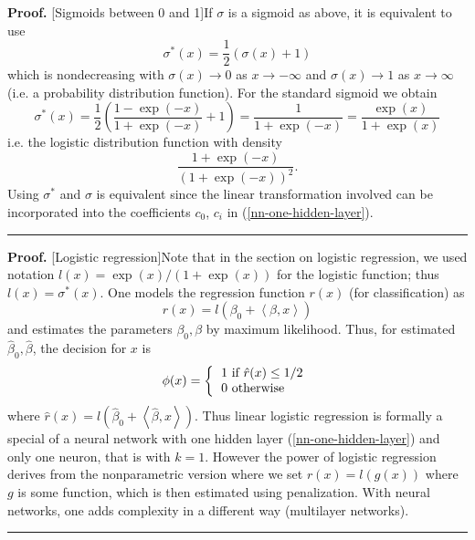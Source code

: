 \documentclass[11pt,twoside]{article}%
\theoremstyle{change}
\newenvironment{proof}[1][Proof]{\textbf{#1.} }{\ \rule{0.5em}{0.5em}}
\begin{document}
\begin{proof}
[Sigmoids between 0 and 1]If $\sigma$ is a sigmoid as above, it is equivalent
to use
\[
\sigma^{\ast}(x)=\frac{1}{2}\left(  \sigma(x)+1\right)
\]
which is nondecreasing with $\sigma(x)\rightarrow0$ as $x\rightarrow-\infty$
and $\sigma(x)\rightarrow1$ as $x\rightarrow\infty$ (i.e. a probability
distribution function). For the standard sigmoid we obtain
\[
\sigma^{\ast}(x)=\frac{1}{2}\left(  \frac{1-\exp(-x)}{1+\exp(-x)}+1\right)
=\frac{1}{1+\exp(-x)}=\frac{\exp(x)}{1+\exp(x)}%
\]
i.e. the logistic distribution function with density
\[
\frac{1+\exp(-x)}{\left(  1+\exp(-x)\right)  ^{2}}.
\]
Using $\sigma^{\ast}$ and $\sigma$ is equivalent since the linear
transformation involved can be incorporated into the coefficients $c_{0}$,
$c_{i}$ in (\ref{nn-one-hidden-layer}).
\end{proof}

\bigskip

\begin{proof}
[Logistic regression]Note that in the section on logistic regression, we used
notation $l(x)=\exp(x)/\left(  1+\exp(x)\right)  $ for the logistic function;
thus $l(x)=\sigma^{\ast}(x).$ One models the regression function $r(x)$ (for
classification) as
\[
r(x)=l(\beta_{0}+\left\langle \beta,x\right\rangle )
\]
and estimates the parameters $\beta_{0},\beta$ by maximum likelihood. Thus,
for estimated $\hat{\beta}_{0},\hat{\beta}$, the decision for $x$ is
\[
\phi(x)=\left\{
\begin{tabular}
[c]{l}%
$1$ if $\hat{r}(x)\leq1/2$\\
$0$ otherwise
\end{tabular}
\right.
\]
where $\hat{r}(x)=l(\hat{\beta}_{0}+\left\langle \hat{\beta},x\right\rangle
).$ Thus linear logistic regression is formally a special of a neural network
with one hidden layer (\ref{nn-one-hidden-layer}) and only one neuron, that is
with $k=1$. However the power of logistic regression derives from the
nonparametric version where we set $r(x)=l(g(x))$ where $g$ is some function,
which is then estimated using penalization. With neural networks, one adds
complexity in a different way (multilayer networks).
\end{proof}

\bigskip
\end{document}

